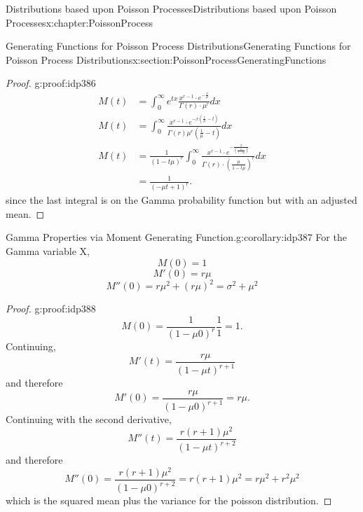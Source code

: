 \documentclass[oneside,10pt,]{book}
\numberwithin{equation}{section}
\begin{document}
\begin{chapterptx}{Distributions based upon Poisson Processes}{}{Distributions based upon Poisson Processes}{}{}{x:chapter:PoissonProcess}
\begin{sectionptx}{Generating Functions for Poisson Process Distributions}{}{Generating Functions for Poisson Process Distributions}{}{}{x:section:PoissonProcessGeneratingFunctions}
\begin{proof}{}{g:proof:idp386}
\begin{align*}
M(t) & = \int_0^{\infty} e^{tx}  \frac{x^{r-1} \cdot e^{-\frac{x}{\mu}}}{\Gamma(r) \cdot \mu^r} dx\\
M(t) & = \int_0^{\infty} \frac{x^{r-1} \cdot e^{-x \left ( \frac{1}{\mu} - t \right )}}{\Gamma(r) \mu^r \left ( \frac{1}{\mu} - t \right )} dx\\
M(t) & = {  \frac{1}{\left ( 1-t \mu \right )^r} } \int_0^{\infty} \frac{x^{r-1} \cdot e^{-\frac{x}{ \left ( \frac{\mu}{1-t \mu} \right )}}}{\Gamma(r) \cdot { \left ( \frac{\mu}{1-t \mu} \right )}^r} dx\\
& =  \frac{1}{\left(-\mu t + 1 \right )^{r}}.
\end{align*}
since the last integral is on the Gamma probability function but with an adjusted mean.%
\end{proof}
\begin{corollary}{Gamma Properties via Moment Generating Function.}{}{g:corollary:idp387}%
For the Gamma variable X,%
\begin{equation*}
M(0) = 1
\end{equation*}
%
\begin{equation*}
M'(0) = r \mu
\end{equation*}
%
\begin{equation*}
M''(0) = r \mu^2 + \left ( r \mu \right )^2 = \sigma^2 + \mu^2
\end{equation*}
%
\end{corollary}
\begin{proof}{}{g:proof:idp388}
%
\begin{equation*}
M(0) = \frac{1}{ \left ( 1-\mu 0 \right )^{r}}  \frac{1}{1} = 1.
\end{equation*}
Continuing,%
\begin{equation*}
M'(t) = \frac{r \mu}{ \left ( 1-\mu t \right )^{r+1}}
\end{equation*}
and therefore%
\begin{equation*}
M'(0) = \frac{r \mu}{ \left ( 1-\mu 0 \right )^{r+1}} = r \mu.
\end{equation*}
Continuing with the second derivative,%
\begin{equation*}
M''(t) = \frac{r(r+1) \mu^2}{ \left ( 1-\mu t \right )^{r+2}}
\end{equation*}
and therefore%
\begin{equation*}
M''(0) = \frac{r(r+1) \mu^2}{ \left ( 1-\mu 0 \right )^{r+2}} = r(r+1) \mu^2 = r \mu^2 + r^2 \mu^2 
\end{equation*}
which is the squared mean plus the variance for the poisson distribution.%

\end{proof}
\end{sectionptx}
\end{chapterptx}
\end{document}
